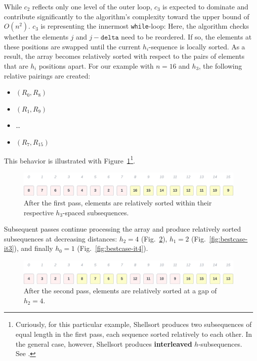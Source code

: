 While $c_2$ reflects only one level of the outer loop, $c_3$ is expected to dominate and contribute significantly to the algorithm's complexity toward the upper bound of $O(n^2)$. $c_3$ is representing the innermost \texttt{while}-loop: Here, the algorithm checks whether the elements $j$ and $j - \texttt{delta}$ need to be reordered.
If so, the elements at these positions are swapped until the current $h_i$-sequence is locally sorted.
As a result, the array becomes relatively sorted with respect to the pairs of elements that are $h_i$ positions apart.
For our example with $n = 16$ and $h_3$, the following relative pairings are created:

\begin{itemize}
    \item $(R_0, R_8)$
    \item $(R_1, R_9)$
    \item \ldots
    \item $(R_7, R_{15})$
\end{itemize}

\noindent
This behavior is illustrated with Figure~\ref{fig:bestcase-it1}\footnote{
    Curiously, for this particular example, Shellsort produces two subsequences of equal length in the first pass, each sequence sorted relatively to each other. In the general case, however, Shellsort produces \textbf{interleaved} $h$-subsequences. See \cite{Knu97b}.
}.

\begin{figure}[!h]
    \centering
    \includegraphics[width=1\columnwidth]{img/bestcase-it1}
    \caption{After the first pass, elements are relatively sorted within their respective $h_3$-spaced subsequences.}
    \label{fig:bestcase-it1}
\end{figure}

Subsequent passes continue processing the array and produce relatively sorted subsequences at decreasing distances: $h_2 = 4$ (Fig.~\ref{fig:bestcase-it2}), $h_1 = 2$ (Fig.~\ref{fig:bestcase-it3}), and finally $h_0 = 1$ (Fig.~\ref{fig:bestcase-it4}).

\begin{figure}[!h]
    \centering
    \includegraphics[width=1\columnwidth]{img/bestcase-it2}
    \caption{After the second pass, elements are relatively sorted at a gap of $h_2=4$.}
    \label{fig:bestcase-it2}
\end{figure}

